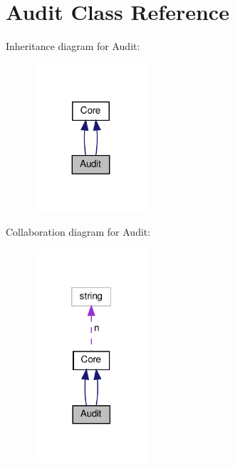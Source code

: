 \hypertarget{classAudit}{}\section{Audit Class Reference}
\label{classAudit}


Inheritance diagram for Audit\+:
\nopagebreak
\begin{figure}[H]
\begin{center}
\leavevmode
\includegraphics[width=119pt]{classAudit__inherit__graph}
\end{center}
\end{figure}


Collaboration diagram for Audit\+:
\nopagebreak
\begin{figure}[H]
\begin{center}
\leavevmode
\includegraphics[width=121pt]{classAudit__coll__graph}
\end{center}
\end{figure}

